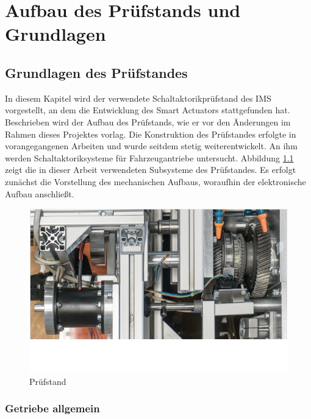 \chapter{Aufbau des Prüfstands und Grundlagen}
\section{Grundlagen des Prüfstandes}
In diesem Kapitel wird der verwendete Schaltaktorikprüfstand des IMS vorgestellt, an dem  die Entwicklung des Smart Actuators stattgefunden hat. Beschrieben wird der Aufbau des Prüfstands, wie er vor den Änderungen im Rahmen dieses Projektes vorlag. Die Konstruktion des Prüfstandes erfolgte in vorangegangenen Arbeiten und wurde seitdem stetig weiterentwickelt. An ihm werden Schaltaktoriksysteme für Fahrzeugantriebe untersucht. Abbildung \ref{fig:Pruefstand} zeigt die in dieser Arbeit verwendeten Subsysteme des Prüfstandes. Es erfolgt zunächst die Vorstellung des mechanischen Aufbaus, woraufhin der elektronische Aufbau anschließt. 
\begin{figure}[h]
	\centering
		\includegraphics{Bilder/Pruefstand.jpg}
	\caption{Prüfstand \cite[S.5]{adp}}
	\label{fig:Pruefstand}
\end{figure}
\subsection{Getriebe allgemein}

